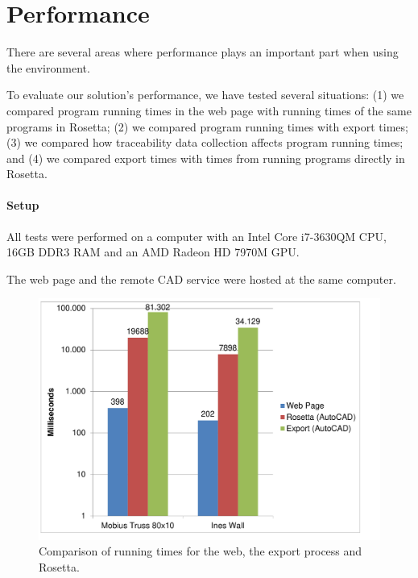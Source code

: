 

\section{Performance}
There are several areas where performance plays an important part when using the environment.

To evaluate our solution's performance, we have tested several situations: (1) we compared program running times in the web page with running times of the same programs in Rosetta; (2) we compared program running times with export times; (3) we compared how traceability data collection affects program running times; and (4) we compared export times with times from running programs directly in Rosetta.

\paragraph{Setup}
All tests were performed on a computer with an Intel Core i7-3630QM CPU, 16GB DDR3 RAM and an AMD Radeon HD 7970M GPU.

The web page and the remote CAD service were hosted at the same computer.


\begin{figure}
  \centering
  \includegraphics[width=12cm]{./images/run_export_rosetta_times}
  \caption{Comparison of running times for the web, the export process and Rosetta.}
  \label{fig:run:export:rosetta:chart}
\end{figure}



